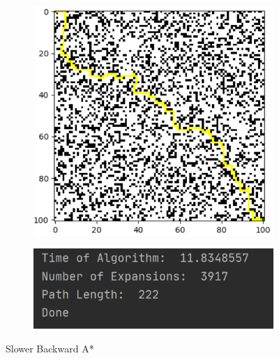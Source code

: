 \documentclass{article}
\begin{document}
\begin{figure}[h!]
\begin{subfigure}{.5\textwidth}
  \centering
  \includegraphics[width=.8\linewidth]{backwardsA.png}
  \label{fig:sfig1}
\end{subfigure}%
\begin{subfigure}{.5\textwidth}
  \centering
  \includegraphics[width=.8\linewidth]{backwardsAstats.png}
  \label{fig:sfig2}
\end{subfigure}
\caption{Slower Backward A*}
\label{fig:fig}
\end{figure}
\end{document}
